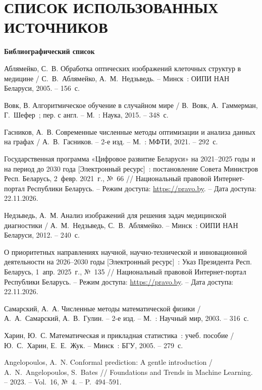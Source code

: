 
\chapter*{\large СПИСОК ИСПОЛЬЗОВАННЫХ ИСТОЧНИКОВ}

\textbf{Библиографический список}
\vspace{0.2cm}

{\small\sloppy

Аблямейко, С.~В. Обработка оптических изображений клеточных структур в медицине / С.~В.~Аблямейко, А.~М.~Недзьведь. -- Минск~: ОИПИ НАН Беларуси, 2005. -- 156~с.

Вовк, В. Алгоритмическое обучение в случайном мире / В.~Вовк, А.~Гаммерман, Г.~Шефер~; пер. с англ. -- М.~: Наука, 2015. -- 348~с.

Гасников, А.~В. Современные численные методы оптимизации и анализа данных на графах / А.~В.~Гасников. -- 2-е изд. -- М.~: МФТИ, 2021. -- 292~с.

Государственная программа «Цифровое развитие Беларуси» на 2021--2025 годы и на период до 2030 года [Электронный ресурс]~: постановление Совета Министров Респ. Беларусь, 2~февр. 2021~г., №~66 // Национальный правовой Интернет-портал Республики Беларусь. -- Режим доступа: \url{https://pravo.by}. -- Дата доступа: 22.11.2026.

Недзьведь, А.~М. Анализ изображений для решения задач медицинской диагностики / А.~М.~Недзьведь, С.~В.~Аблямейко. -- Минск~: ОИПИ НАН Беларуси, 2012. -- 240~с.

О приоритетных направлениях научной, научно-технической и инновационной деятельности на 2026--2030 годы [Электронный ресурс]~: Указ Президента Респ. Беларусь, 1~апр. 2025~г., №~135 // Национальный правовой Интернет-портал Республики Беларусь. -- Режим доступа: \url{https://pravo.by}. -- Дата доступа: 22.11.2026.

Самарский, А.~А. Численные методы математической физики / А.~А.~Самарский, А.~В.~Гулин. -- 2-е изд. -- М.~: Научный мир, 2003. -- 316~с.

Харин, Ю.~С. Математическая и прикладная статистика~: учеб. пособие / Ю.~С.~Харин, Е.~Е.~Жук. -- Минск~: БГУ, 2005. -- 279~с.

Angelopoulos, A.~N. Conformal prediction: A gentle introduction / A.~N.~Angelopoulos, S.~Bates // Foundations and Trends in Machine Learning. -- 2023. -- Vol.~16, №~4. -- P.~494--591.

}
